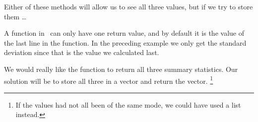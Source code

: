 Either of these methods will allow us to see all three values, 
but if we try to store them \dots
{}%

\begin{knitrout}
\end{knitrout}

A function in \R\ can only have one return value, and by default it is the 
value of the last line in the function.  
In the preceding example we only get the standard deviation since 
that is the value we calculated last.

We would really like the function to return all three summary statistics.  
Our solution will be to
store all three in a vector and return the vector.%
\footnote{If the values had not all been of the same mode, we 
could have used a list instead.}

